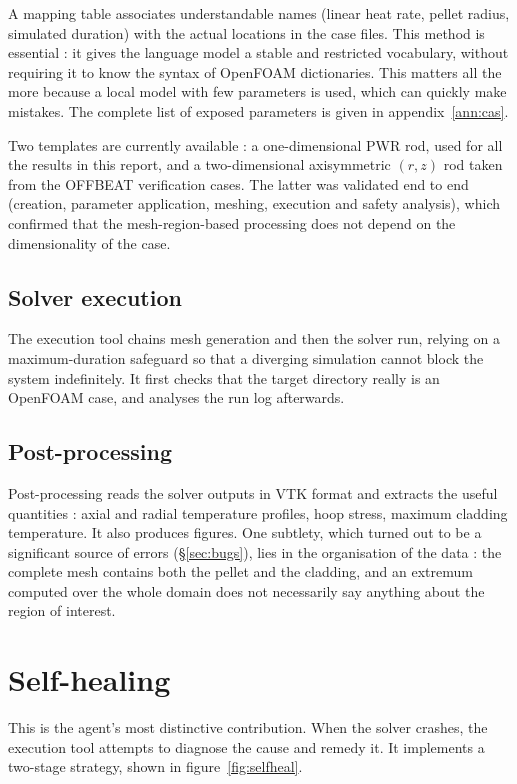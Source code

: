 A mapping table associates understandable names (linear heat rate, pellet
radius, simulated duration) with the actual locations in the case files. This
method is essential : it gives the language model a stable and restricted
vocabulary, without requiring it to know the syntax of OpenFOAM dictionaries.
This matters all the more because a local model with few parameters is used,
which can quickly make mistakes. The complete list of exposed parameters is
given in appendix~\ref{ann:cas}.

Two templates are currently available : a one-dimensional PWR rod, used for all
the results in this report, and a two-dimensional axisymmetric $(r,z)$ rod taken
from the OFFBEAT verification cases. The latter was validated end to end
(creation, parameter application, meshing, execution and safety analysis), which
confirmed that the mesh-region-based processing does not depend on the
dimensionality of the case.

\subsection{Solver execution}

The execution tool chains mesh generation and then the solver run, relying on a
maximum-duration safeguard so that a diverging simulation cannot block the
system indefinitely. It first checks that the target directory really is an
OpenFOAM case, and analyses the run log afterwards.

\subsection{Post-processing}

Post-processing reads the solver outputs in VTK format and extracts the useful
quantities : axial and radial temperature profiles, hoop stress, maximum cladding
temperature. It also produces figures. One subtlety, which turned out to be a
significant source of errors (§\ref{sec:bugs}), lies in the organisation of the
data : the complete mesh contains both the pellet and the cladding, and an
extremum computed over the whole domain does not necessarily say anything about
the region of interest.

\section{Self-healing}
\label{sec:selfhealing}

This is the agent's most distinctive contribution. When the solver crashes, the
execution tool attempts to diagnose the cause and remedy it. It implements a
two-stage strategy, shown in figure~\ref{fig:selfheal}.


